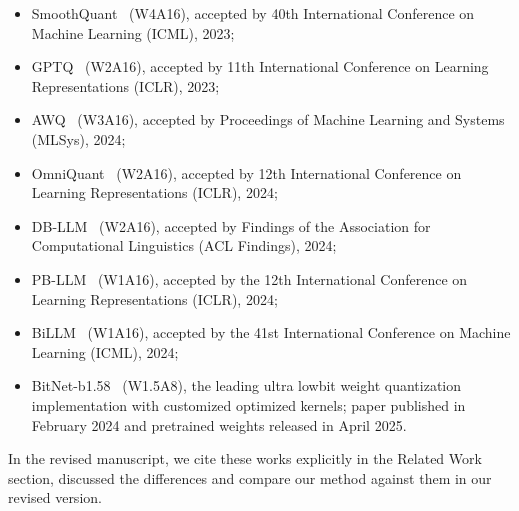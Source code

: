 \begin{revmeta}[]
\begin{itemize}
\begin{itemize}
        \item SmoothQuant~\cite{xiao2023smoothquant} (W4A16), accepted by 40th International Conference on Machine Learning (ICML), 2023; 
        \item GPTQ~\cite{gptq} (W2A16), accepted by 11th International Conference on Learning Representations (ICLR), 2023; %
        \item AWQ~\cite{lin2024awq} (W3A16), accepted by Proceedings of Machine Learning and Systems (MLSys), 2024; 
        \item OmniQuant~\cite{shao2023omniquant} (W2A16),  accepted by  12th International Conference on Learning Representations (ICLR), 2024; 
        \item DB-LLM~\cite{chen2024dbllm} (W2A16), accepted by Findings of the Association for Computational Linguistics (ACL Findings), 2024; 
        \item PB-LLM~\cite{shang2023pbllm} (W1A16), accepted by the 12th International Conference on Learning Representations (ICLR), 2024; 
        \item BiLLM~\cite{huang2024billm} (W1A16), accepted by the 41st International Conference on Machine Learning (ICML), 2024; 
        \item BitNet-b1.58~\cite{wang2023bitnet} (W1.5A8), the leading ultra lowbit weight quantization implementation with customized optimized kernels; paper published in February 2024 and pretrained weights released in April 2025. %
    \end{itemize}
\end{itemize}

In the revised manuscript, we cite these works explicitly in the Related Work section, discussed the differences and compare our method against them in our revised version. 


\end{revmeta}
